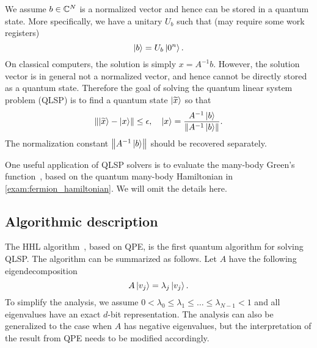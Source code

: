 We assume $b\in\mathbb{C}^N$ is a normalized vector and hence can be stored in a quantum state. 
More specifically, we have a unitary $U_b$ such that (may require some work registers)
\begin{equation}
\ket{b}=U_b\ket{0^n}.
\end{equation}
On classical computers, the solution is simply $x=A^{-1}b$.
However, the solution vector is in general not a normalized vector, and hence cannot be directly stored as a quantum state.
Therefore the goal of solving the quantum linear system problem (QLSP) is to find a quantum state $\ket{\widetilde{x}}$ so that
\begin{equation}
\left\lVert\ket{\widetilde{x}}-\ket{x}\right\rVert\le \epsilon, \quad \ket{x}=\frac{A^{-1}\ket{b}}{\left\lVert A^{-1}\ket{b}\right\rVert}.
\end{equation}
The normalization constant $\left\lVert A^{-1}\ket{b}\right\rVert$ should be recovered separately.

One useful application of QLSP solvers is to evaluate the many-body Green's function~\cite{NegeleOrland1988}, based on the quantum many-body Hamiltonian in \cref{exam:fermion_hamiltonian}. 
We will omit the details here.

\subsection{Algorithmic description}

The HHL algorithm~\cite{HarrowHassidimLloyd2009}, based on QPE, is the first quantum algorithm for solving QLSP. 
The algorithm can be summarized as follows. Let $A$ have the following eigendecomposition
\begin{equation}
A\ket{v_j}=\lambda_j\ket{v_j}.
\end{equation}
To simplify the analysis, we assume $0< \lambda_0\le \lambda_1\le \ldots\le \lambda_{N-1}< 1$ and all eigenvalues have an exact $d$-bit representation. 
The analysis can also be generalized to the case when $A$ has negative eigenvalues, but the interpretation of the result from QPE needs to be modified accordingly.

